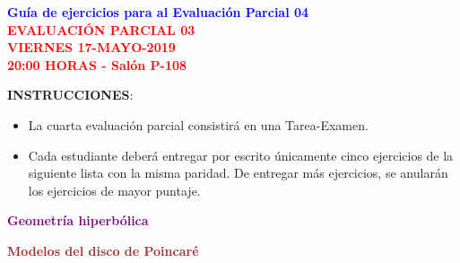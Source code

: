 \documentclass[11pt]{report}
\numberwithin{section}{chapter}
\begin{document}
\begin{center}
\textcolor{blue}{\textbf{\large Guía de ejercicios para al Evaluación Parcial 04}}\\
\vspace{0.5 cm}
\textcolor{red}{\textbf{\large EVALUACIÓN PARCIAL 03 \\ VIERNES 17-MAYO-2019\\ 20:00 HORAS - Salón P-108}}
\end{center}

\textbf{INSTRUCCIONES}:
\begin{itemize}
\item La cuarta evaluación parcial consistirá en una Tarea-Examen.
\item Cada estudiante deberá entregar por escrito únicamente cinco ejercicios de la siguiente lista con la misma paridad. De entregar más ejercicios, se anularán los ejercicios de mayor puntaje.
\end{itemize}

\begin{center}
\textcolor{purple}{\textbf{\large Geometría hiperbólica}}
\end{center}

\begin{center}
\textcolor{brown}{\textbf{\large Modelos del disco de Poincaré}}
\end{center}
\end{document}
